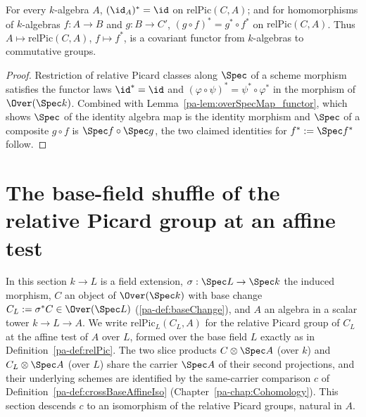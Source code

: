 \begin{lemma}
  \label{pa-lem:relPicAlgMap_functor}
  \leanok

  For every \(k\)-algebra \(A\), \((\id_A)^{*} = \id\) on \(\mathrm{relPic}(C,A)\); and for
  homomorphisms of \(k\)-algebras \(f \colon A \to B\) and \(g \colon B \to C'\),
  \((g \circ f)^{*} = g^{*} \circ f^{*}\) on \(\mathrm{relPic}(C,A)\). Thus
  \(A \mapsto \mathrm{relPic}(C,A)\), \(f \mapsto f^{*}\), is a covariant functor from
  \(k\)-algebras to commutative groups.
\end{lemma}
\begin{proof}
  \leanok
  Restriction of relative Picard classes along \(\Spec\) of a scheme morphism satisfies the
  functor laws \(\id^{*} = \id\) and \((\varphi \circ \psi)^{*} = \psi^{*} \circ \varphi^{*}\)
  in the morphism of \(\Over(\Spec k)\). Combined with
  Lemma~\ref{pa-lem:overSpecMap_functor}, which shows \(\Spec\) of the identity algebra map is the
  identity morphism and \(\Spec\) of a composite \(g \circ f\) is \(\Spec f \circ \Spec g\), the
  two claimed identities for \(f^{*} := \Spec f{}^{*}\) follow.
\end{proof}

\section{The base-field shuffle of the relative Picard group at an affine test}
\label{pa-sec:relPicCrossBase}

In this section \(k \to L\) is a field extension, \(\sigma : \Spec L \to \Spec k\) the
induced morphism, \(C\) an object of \(\Over(\Spec k)\) with base change
\(C_L := \sigma^{*}C \in \Over(\Spec L)\) (\ref{pa-def:baseChange}), and \(A\) an algebra
in a scalar tower \(k \to L \to A\). We write \(\mathrm{relPic}_L(C_L, A)\) for the
relative Picard group of \(C_L\) at the affine test of \(A\) over \(L\), formed over
the base field \(L\) exactly as in Definition~\ref{pa-def:relPic}. The two slice products
\(C \otimes \Spec A\) (over \(k\)) and \(C_L \otimes \Spec A\) (over \(L\)) share the
carrier \(\Spec A\) of their second projections, and their underlying schemes are
identified by the same-carrier comparison \(c\) of
Definition~\ref{pa-def:crossBaseAffineIso}
(Chapter~\ref{pa-chap:Cohomology}). This section descends \(c\) to an isomorphism of the
relative Picard groups, natural in \(A\).

